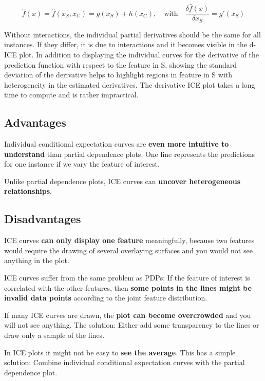 \documentclass[
  11pt,
]{scrbook}
\begin{document}
\[\hat{f}(x)=\hat{f}(x_S,x_C)=g(x_S)+h(x_C),\quad\text{with}\quad\frac{\delta\hat{f}(x)}{\delta{}x_S}=g'(x_S)\]

Without interactions, the individual partial derivatives should be the same for all instances.
If they differ, it is due to interactions and it becomes visible in the d-ICE plot.
In addition to displaying the individual curves for the derivative of the prediction function with respect to the feature in S, showing the standard deviation of the derivative helps to highlight regions in feature in S with heterogeneity in the estimated derivatives.
The derivative ICE plot takes a long time to compute and is rather impractical.

\hypertarget{advantages-12}{%
\subsection{Advantages}\label{advantages-12}}

Individual conditional expectation curves are \textbf{even more intuitive to understand} than partial dependence plots.
One line represents the predictions for one instance if we vary the feature of interest.

Unlike partial dependence plots, ICE curves can \textbf{uncover heterogeneous relationships}.

\hypertarget{disadvantages-12}{%
\subsection{Disadvantages}\label{disadvantages-12}}

ICE curves \textbf{can only display one feature} meaningfully, because two features would require the drawing of several overlaying surfaces and you would not see anything in the plot.

ICE curves suffer from the same problem as PDPs:
If the feature of interest is correlated with the other features, then \textbf{some points in the lines might be invalid data points} according to the joint feature distribution.

If many ICE curves are drawn, the \textbf{plot can become overcrowded} and you will not see anything.
The solution: Either add some transparency to the lines or draw only a sample of the lines.

In ICE plots it might not be easy to \textbf{see the average}.
This has a simple solution:
Combine individual conditional expectation curves with the partial dependence plot.
\end{document}
